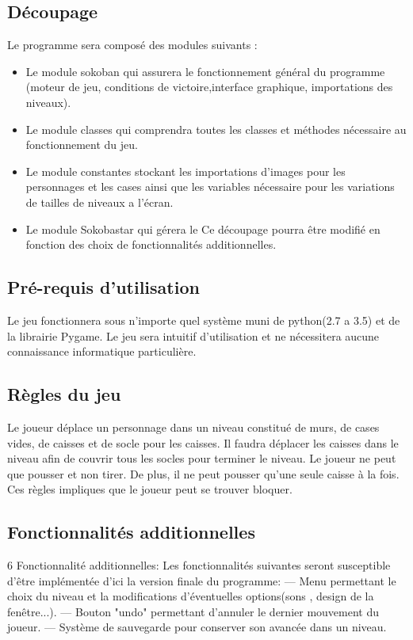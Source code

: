\documentclass{article}
\begin{document}
		\subsection{Découpage}
		

		Le programme sera composé des modules suivants :
		\begin{itemize}
\item Le module sokoban qui assurera le fonctionnement général du programme
(moteur de jeu, conditions de victoire,interface graphique, importations
des niveaux).
\item Le module classes qui comprendra toutes les classes et méthodes nécessaire
au fonctionnement du jeu.
\item Le module constantes stockant les importations d’images pour les personnages
et les cases ainsi que les variables nécessaire pour les variations
de tailles de niveaux a l’écran.
\item Le module Sokobastar qui gérera le 
Ce découpage pourra être modifié en fonction des choix de fonctionnalités additionnelles.
		
		\end{itemize}
		\subsection{Pré-requis d'utilisation}
		Le jeu fonctionnera sous n’importe quel système muni de python(2.7 a 3.5) et de la librairie Pygame. Le jeu sera intuitif d’utilisation et ne nécessitera aucune connaissance informatique particulière.
		\subsection{Règles du jeu}
		Le joueur déplace un personnage dans un niveau constitué de murs, de cases
vides, de caisses et de socle pour les caisses. Il faudra déplacer les caisses dans
le niveau afin de couvrir tous les socles pour terminer le niveau. Le joueur ne peut que pousser et non tirer. De plus, il ne peut pousser qu’une seule caisse à la fois. Ces règles impliques que le joueur peut se trouver bloquer.
		\subsection{Fonctionnalités additionnelles}
			6 Fonctionnalité additionnelles: \newline
Les fonctionnalités suivantes seront susceptible d’être implémentée d’ici la
version finale du programme: \newline
— Menu permettant le choix du niveau et la modifications d’éventuelles
options(sons , design de la fenêtre...). \newline
— Bouton "undo" permettant d’annuler le dernier mouvement du joueur. \newline
— Système de sauvegarde pour conserver son avancée dans un niveau. \newline
\end{document}
